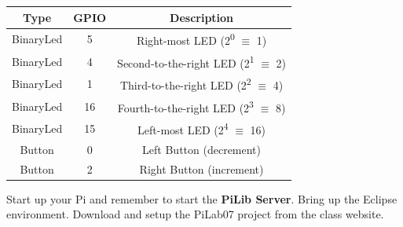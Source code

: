 \begin{center}
	\begin{tabular}{c | c | c}
		\hline
		\textbf{Type} & \textbf{GPIO} & \textbf{Description} \\ \hline
		BinaryLed & 5 & Right-most LED (2\textsuperscript{0} $\equiv$ 1) \\ 
		\hline
		BinaryLed & 4 & Second-to-the-right LED (2\textsuperscript{1} $\equiv$ 2) \\ 
		\hline
		BinaryLed & 1 & Third-to-the-right LED (2\textsuperscript{2} $\equiv$ 4) \\ 
		\hline
		BinaryLed & 16 & Fourth-to-the-right LED (2\textsuperscript{3} $\equiv$ 8) \\ 
		\hline
		BinaryLed & 15 & Left-most LED (2\textsuperscript{4} $\equiv$ 16) \\ 
		\hline
		Button & 0 & Left Button (decrement)\\ 
		\hline
		Button & 2 & Right Button (increment)\\ 
		\hline	
	\end{tabular}
\end{center}

\vspace{10pt}

Start up your Pi and remember to start the \textbf{PiLib Server}. Bring up the Eclipse environment. Download and setup the PiLab07 project from the class website.

